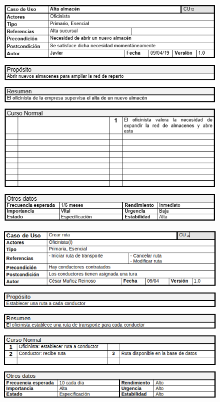 \begin{figure}[H]
	\centering
	\includegraphics[width=16cm]{12}
\end{figure}
\begin{figure}[H]
	\centering
	\includegraphics[width=16cm]{29}
\end{figure}
